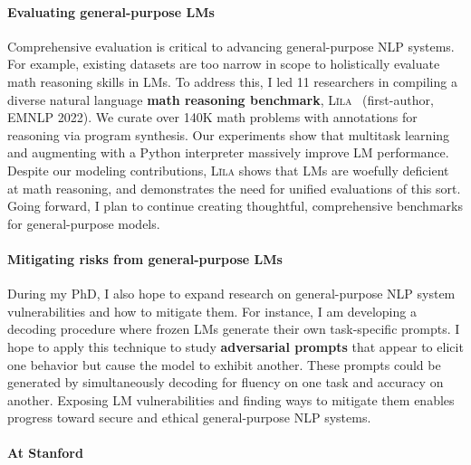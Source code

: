 \documentclass[11pt]{article}
\newcommand\lila{\textsc{L\={\i}la}\xspace}
\newcommand\inst{Stanford\xspace}
\begin{document}
\paragraph{Evaluating general-purpose LMs}

Comprehensive evaluation is critical to advancing general-purpose NLP systems.
For example, existing datasets are too narrow in scope 
to holistically evaluate math reasoning skills in LMs.
To address this, I led 11 researchers 
in compiling a diverse natural language 
\textbf{math reasoning benchmark}, 
\lila~\cite{Mishra2022LilaAU} (first-author, EMNLP 2022).
We curate over 140K math problems
with annotations for reasoning via program synthesis. 
Our experiments show that multitask learning 
and augmenting with a Python interpreter
massively improve LM performance. 
Despite our modeling contributions, \lila shows that LMs 
are woefully deficient at math reasoning,
and demonstrates the need for unified evaluations of this sort.
Going forward, I plan to continue creating thoughtful, comprehensive benchmarks 
for general-purpose models.

\paragraph{Mitigating risks from general-purpose LMs} 

During my PhD, I also hope to expand research 
on general-purpose NLP system vulnerabilities and how to mitigate them.
For instance, I am developing a decoding procedure where frozen LMs 
generate their own task-specific prompts.
I hope to apply this technique
to study \textbf{adversarial prompts}
that appear to elicit one behavior 
but cause the model to exhibit another.
These prompts could be generated by simultaneously 
decoding for fluency on one task and accuracy on another.
Exposing LM vulnerabilities and finding ways to mitigate them
enables progress 
toward secure and ethical general-purpose NLP systems. 

\paragraph{At \inst} 





\end{document}
